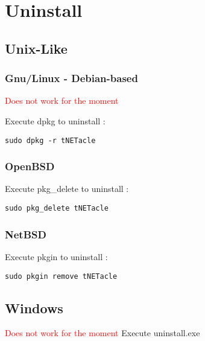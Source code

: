 \section{Uninstall}
\subsection{Unix-Like}
\subsubsection{Gnu/Linux - Debian-based}
\textcolor{red}{Does not work for the moment}

Execute dpkg to uninstall :

\begin{lstlisting}
sudo dpkg -r tNETacle
\end{lstlisting}

\subsubsection{OpenBSD}

Execute pkg\_delete to uninstall :

\begin{lstlisting}
sudo pkg_delete tNETacle
\end{lstlisting}

\subsubsection{NetBSD}

Execute pkgin to uninstall :

\begin{lstlisting}
sudo pkgin remove tNETacle
\end{lstlisting}

\subsection{Windows}
\textcolor{red}{Does not work for the moment}
Execute uninstall.exe
